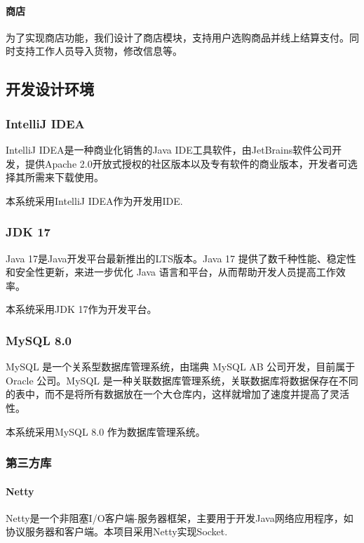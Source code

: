 \documentclass{article}
\begin{document}
\paragraph{商店}
为了实现商店功能，我们设计了商店模块，支持用户选购商品并线上结算支付。同时支持工作人员导入货物，修改信息等。


\subsection{开发设计环境}

\subsubsection{IntelliJ IDEA}

IntelliJ IDEA是一种商业化销售的Java IDE工具软件，由JetBrains软件公司开发，提供Apache 2.0开放式授权的社区版本以及专有软件的商业版本，开发者可选择其所需来下载使用。

本系统采用IntelliJ IDEA作为开发用IDE.

\subsubsection{JDK 17}

Java 17是Java开发平台最新推出的LTS版本。Java 17 提供了数千种性能、稳定性和安全性更新，来进一步优化 Java 语言和平台，从而帮助开发人员提高工作效率。

本系统采用JDK 17作为开发平台。

\subsubsection{MySQL 8.0}

MySQL 是一个关系型数据库管理系统，由瑞典 MySQL AB 公司开发，目前属于 Oracle 公司。MySQL 是一种关联数据库管理系统，关联数据库将数据保存在不同的表中，而不是将所有数据放在一个大仓库内，这样就增加了速度并提高了灵活性。

本系统采用MySQL 8.0 作为数据库管理系统。

\subsubsection{第三方库}

\paragraph{Netty}
Netty是一个非阻塞I/O客户端-服务器框架，主要用于开发Java网络应用程序，如协议服务器和客户端。本项目采用Netty实现Socket.
\end{document}
